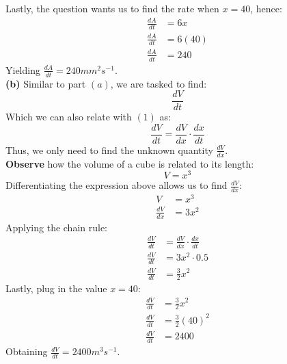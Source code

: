\documentclass[hidelinks, a4paper, 12pt]{article}
\newcommand{\bd}{\textbf}
\newcommand{\n}{\\[\baselineskip]}
\begin{document}
                Lastly, the question wants us to find the rate when $x=40$, hence:
                \[\begin{split}
                    \frac{dA}{dt} &= 6x\\
                    \frac{dA}{dt} &= 6(40)\\
                    \frac{dA}{dt} &=  240
                \end{split}\]
                Yielding $\frac{dA}{dt} =  240mm^2s^{-1}$.\n
                \bd{(b)} Similar to part $(a)$, we are tasked to find:
                \begin{equation}
                    \frac{dV}{dt}
                \end{equation}
                Which we can also relate with $(1)$ as:
                \[\frac{dV}{dt} = \frac{dV}{dx} \cdot \frac{dx}{dt}\]
                Thus, we only need to find the unknown quantity $\frac{dV}{dx}$.\n
                \bd{Observe} how the volume of a cube is related to its length:
                \[V = x^3\]
                Differentiating the expression above allows us to find $\frac{dV}{dx}$:
                \[\begin{split}
                    V &= x^3\\
                    \frac{dV}{dx} &= 3x^2
                \end{split}\]
                Applying the chain rule:
                \[\begin{split}
                    \frac{dV}{dt} &= \frac{dV}{dx} \cdot \frac{dx}{dt}\\
                    \frac{dV}{dt} &= 3x^2 \cdot 0.5\\
                    \frac{dV}{dt} &= \frac{3}{2}x^2
                \end{split}\]
                Lastly, plug in the value $x = 40$:
                \[\begin{split}
                    \frac{dV}{dt} &= \frac{3}{2}x^2\\
                    \frac{dV}{dt} &= \frac{3}{2}(40)^2\\
                    \frac{dV}{dt} &= 2400
                \end{split}\]
                Obtaining $\frac{dV}{dt} = 2400m^3s^{-1}$.
\end{document}
